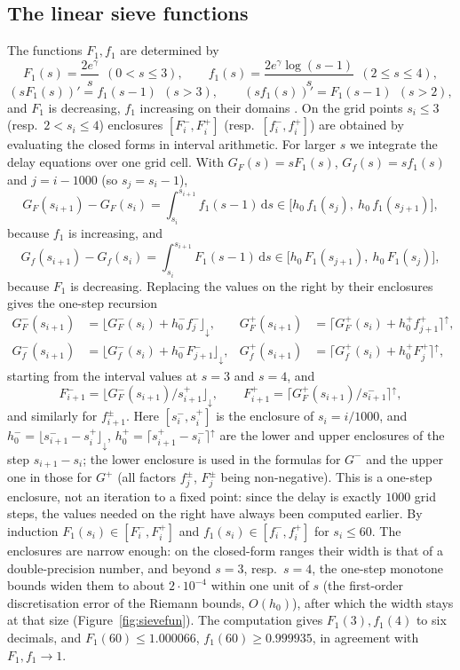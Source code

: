 \documentclass[11pt]{amsart}
\theoremstyle{remark}
\newcommand{\dd}{\mathrm{d}}
\begin{document}
\subsection{The linear sieve functions}\label{app:sieve}
The functions $F_1,f_1$ are determined by
\[
F_1(s)=\frac{2e^\gamma}{s}\ \ (0<s\le3),\qquad f_1(s)=\frac{2e^\gamma\log(s-1)}{s}\ \ (2\le s\le4),
\]
\[
(sF_1(s))'=f_1(s-1)\ \ (s>3),\qquad (sf_1(s))'=F_1(s-1)\ \ (s>2),
\]
and $F_1$ is decreasing, $f_1$ increasing on their domains \cite[Chapter~11]{FI}. On the grid points $s_i\le3$ (resp.\ $2<s_i\le4$) enclosures $[F^-_i,F^+_i]$ (resp.\ $[f^-_i,f^+_i]$) are obtained by evaluating the closed forms in interval arithmetic. For larger $s$ we integrate the delay equations over one grid cell. With $G_F(s)=sF_1(s)$, $G_f(s)=sf_1(s)$ and $j=i-1000$ (so $s_j=s_i-1$),
\[
G_F(s_{i+1})-G_F(s_i)=\int_{s_i}^{s_{i+1}}f_1(s-1)\,\dd s\in\bigl[h_0\,f_1(s_j),\ h_0\,f_1(s_{j+1})\bigr],
\]
because $f_1$ is increasing, and
\[
G_f(s_{i+1})-G_f(s_i)=\int_{s_i}^{s_{i+1}}F_1(s-1)\,\dd s\in\bigl[h_0\,F_1(s_{j+1}),\ h_0\,F_1(s_j)\bigr],
\]
because $F_1$ is decreasing. Replacing the values on the right by their enclosures gives the one-step recursion
\begin{align*}
G^-_F(s_{i+1})&=\lfloor G^-_F(s_i)+h_0^-f^-_j\rfloor_\downarrow, & G^+_F(s_{i+1})&=\lceil G^+_F(s_i)+h_0^+f^+_{j+1}\rceil^\uparrow,\\
G^-_f(s_{i+1})&=\lfloor G^-_f(s_i)+h_0^-F^-_{j+1}\rfloor_\downarrow, & G^+_f(s_{i+1})&=\lceil G^+_f(s_i)+h_0^+F^+_{j}\rceil^\uparrow,
\end{align*}
starting from the interval values at $s=3$ and $s=4$, and
\[
F^-_{i+1}=\bigl\lfloor G_F^-(s_{i+1})/s_{i+1}^+\bigr\rfloor_\downarrow,\qquad F^+_{i+1}=\bigl\lceil G_F^+(s_{i+1})/s_{i+1}^-\bigr\rceil^\uparrow,
\]
and similarly for $f^\pm_{i+1}$. Here $[s_i^-,s_i^+]$ is the enclosure of $s_i=i/1000$, and $h_0^-=\lfloor s_{i+1}^--s_i^+\rfloor_\downarrow$, $h_0^+=\lceil s_{i+1}^+-s_i^-\rceil^\uparrow$ are the lower and upper enclosures of the step $s_{i+1}-s_i$; the lower enclosure is used in the formulas for $G^-$ and the upper one in those for $G^+$ (all factors $f^\pm_j$, $F^\pm_j$ being non-negative). This is a one-step enclosure, not an iteration to a fixed point: since the delay is exactly $1000$ grid steps, the values needed on the right have always been computed earlier. By induction $F_1(s_i)\in[F^-_i,F^+_i]$ and $f_1(s_i)\in[f^-_i,f^+_i]$ for $s_i\le60$. The enclosures are narrow enough: on the closed-form ranges their width is that of a double-precision number, and beyond $s=3$, resp.\ $s=4$, the one-step monotone bounds widen them to about $2\cdot10^{-4}$ within one unit of $s$ (the first-order discretisation error of the Riemann bounds, $O(h_0)$), after which the width stays at that size (Figure~\ref{fig:sievefun}). The computation gives $F_1(3),f_1(4)$ to six decimals, and $F_1(60)\le1.000066$, $f_1(60)\ge0.999935$, in agreement with $F_1,f_1\to1$.
\end{document}
